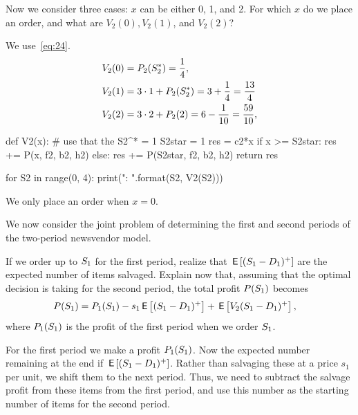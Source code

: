 \begin{exercise}
Now we consider three cases: $x$ can be either 0, 1, and 2. For which $x$ do we place an order, and what are $V_2(0), V_2(1)$, and $V_2(2)$? 
\begin{solution}
We use~\eqref{eq:24}. 
\begin{align*}
  V_2(0) &= P_2(S_2^*) = \frac 1 4,\\
  V_2(1) &= 3\cdot 1 + P_2(S_2^*) = 3 + \frac 1 4 = \frac{13}{4}\\
  V_2(2) &= 3\cdot 2 + P_2(2) = 6 - \frac 1{10} = \frac{59}{10},
\end{align*}

\begin{pyconsole}
def V2(x):
    # use that the S2^* = 1
    S2star = 1
    res = c2*x
    if x >= S2star:
        res += P(x, f2, b2, h2)
    else:
        res += P(S2star, f2, b2, h2)
    return res

for S2 in range(0, 4):
    print("{}: {}".format(S2, V2(S2)))

\end{pyconsole}

We only place an order when $x=0$. 
\end{solution}
\end{exercise}

We now consider the joint problem of determining the first and second periods of the two-period newsvendor model.

\begin{exercise}
If we order up to $S_1$ for the first period, realize that $\,\mathsf{E}\left[(S_1-D_1)^+\right]$ are the expected number of items salvaged. Explain now that, assuming that the optimal decision is taking for the second period, the total profit $P(S_1)$ becomes
\begin{align*}
  P(S_1) 
&= P_1(S_1) - s_1 \,\mathsf{E}\left[(S_1 - D_1)^+\right] + \,\mathsf{E}\left[V_2(S_1-D_1)^+\right],
\end{align*}
where $P_1(S_1)$ is the profit of the first period when we order $S_1$. 
\begin{solution}
For the first period we make a profit $P_1(S_1)$. Now the expected number remaining at the end if $\,\mathsf{E}\left[(S_1 - D_1)^+\right]$. Rather than salvaging these at a price $s_1$ per unit, we shift them to the next period. Thus, we need to subtract the salvage profit from these items from the first period, and use this number as the starting number of items for the second period. 
\end{solution}
\end{exercise}



